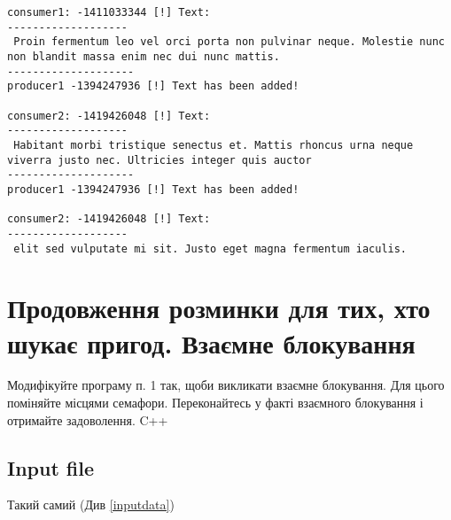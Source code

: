 \documentclass{article}
\begin{document}
\begin{lstlisting}[]
consumer1: -1411033344 [!] Text: 
-------------------
 Proin fermentum leo vel orci porta non pulvinar neque. Molestie nunc non blandit massa enim nec dui nunc mattis. 
--------------------
producer1 -1394247936 [!] Text has been added! 

consumer2: -1419426048 [!] Text: 
-------------------
 Habitant morbi tristique senectus et. Mattis rhoncus urna neque viverra justo nec. Ultricies integer quis auctor
--------------------
producer1 -1394247936 [!] Text has been added! 

consumer2: -1419426048 [!] Text: 
-------------------
 elit sed vulputate mi sit. Justo eget magna fermentum iaculis.
\end{lstlisting}

\newpage
\section{Продовження розминки для тих, хто шукає пригод. Взаємне блокування}
Модифікуйте програму п. 1 так, щоби викликати взаємне блокування.
Для цього поміняйте місцями семафори. Переконайтесь у факті взаємного
блокування і отримайте задоволення. C++

\subsection{Input file}

Такий самий (Див \ref{inputdata})
\end{document}
